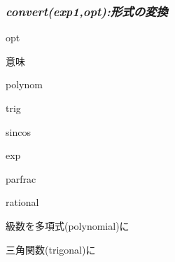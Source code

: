 \documentclass{article}
\begin{document}
\subsubsection{\textit{convert(exp1,opt)}\textit{:形式の変換}}
\begin{maplelatex}\begin{Maple Normal}{
opt}\end{Maple Normal}
\end{maplelatex}
\begin{maplelatex}\begin{Maple Normal}{
意味}\end{Maple Normal}
\end{maplelatex}
\begin{maplelatex}\begin{Maple Normal}{
polynom}\end{Maple Normal}
\end{maplelatex}
\begin{maplelatex}\begin{Maple Normal}{
trig}\end{Maple Normal}
\end{maplelatex}
\begin{maplelatex}\begin{Maple Normal}{
sincos}\end{Maple Normal}
\end{maplelatex}
\begin{maplelatex}\begin{Maple Normal}{
exp}\end{Maple Normal}
\end{maplelatex}
\begin{maplelatex}\begin{Maple Normal}{
parfrac}\end{Maple Normal}
\end{maplelatex}
\begin{maplelatex}\begin{Maple Normal}{
rational}\end{Maple Normal}
\end{maplelatex}
\begin{maplelatex}\begin{Maple Normal}{
級数を多項式(polynomial)に}\end{Maple Normal}
\end{maplelatex}
\begin{maplelatex}\begin{Maple Normal}{
三角関数(trigonal)に}\end{Maple Normal}
\end{maplelatex}
\end{document}

